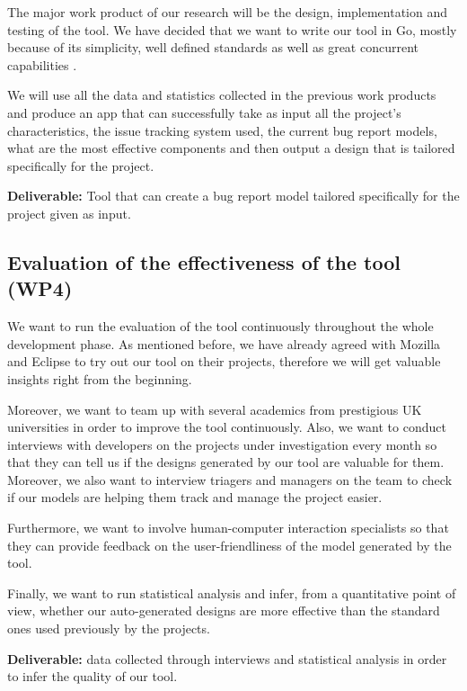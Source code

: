 \documentclass[11pt,english,twocolumn]{article}
\begin{document}
The major work product of our research will be the design, implementation and testing of the 
tool. We have decided that we want to write our tool in Go, mostly because of its 
simplicity, well defined standards as well as great concurrent capabilities \cite{forsby2015evaluation}.

We will use all the data and statistics collected in the previous work products and produce
an app that can successfully take as input all the project's characteristics, the issue tracking
system used, the current bug report models, what are the most effective components and then 
output a design that is tailored specifically for the project.

\textbf{Deliverable:} Tool that can create a bug report model tailored specifically for the 
project given as input.

\subsection*{Evaluation of the effectiveness of the tool (WP4)}

We want to run the evaluation of the tool continuously throughout the whole development phase. 
As mentioned before, we have already agreed with Mozilla and Eclipse to try out our tool on 
their projects, therefore we will get valuable insights right from the beginning.

Moreover, we want to team up with several academics from prestigious UK universities in order 
to improve the tool continuously. Also, we want to conduct interviews with developers on the 
projects under investigation every month so that they can tell us if the designs generated 
by our tool are valuable for them. Moreover, we also want to interview triagers and managers 
on the team to check if our models are helping them track and manage the project easier.

Furthermore, we want to involve human-computer interaction specialists so that they can 
provide feedback on the user-friendliness of the model generated by the tool.

Finally, we want to run statistical analysis and infer, from a quantitative point of view,
whether our auto-generated designs are more effective than the standard ones used previously 
by the projects.

\textbf{Deliverable:} data collected through interviews and statistical analysis in order 
to infer the quality of our tool.

\end{document}
